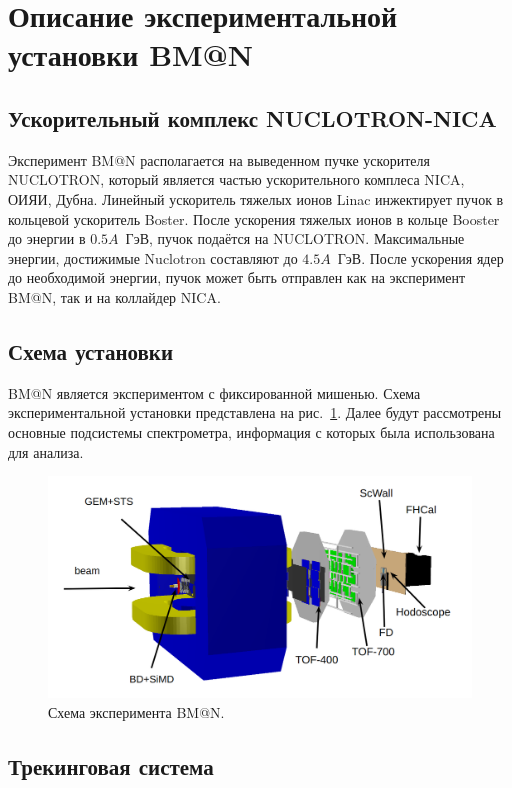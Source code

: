 
\section{Описание экспериментальной установки BM@N}

\subsection{Ускорительный комплекс NUCLOTRON-NICA}

Эксперимент BM@N располагается на выведенном пучке ускорителя NUCLOTRON, который является частью ускорительного комплеса NICA, ОИЯИ, Дубна.
Линейный ускоритель тяжелых ионов Linac инжектирует пучок в кольцевой ускоритель Boster.
После ускорения тяжелых ионов в кольце Booster до энергии в $0.5A$~ГэВ, пучок подаётся на NUCLOTRON.
Максимальные энергии, достижимые Nuclotron составляют до $4.5A$~ГэВ.
После ускорения ядер до необходимой энергии, пучок может быть отправлен как на эксперимент BM@N, так и на коллайдер NICA.

\subsection{Схема установки}

BM@N является экспериментом с фиксированной мишенью.
Схема экспериментальной установки представлена на рис.~\ref{fig:bmn_layout}.
Далее будут рассмотрены основные подсистемы спектрометра, информация с которых была использована для анализа.
%
\begin{figure}[ht]
\begin{center}
\includegraphics[width=0.95\linewidth]{images/BM@N_layout.png}
\caption{Схема эксперимента BM@N.}
\label{fig:bmn_layout}
\end{center}
\end{figure}

\subsection{Трекинговая система}

